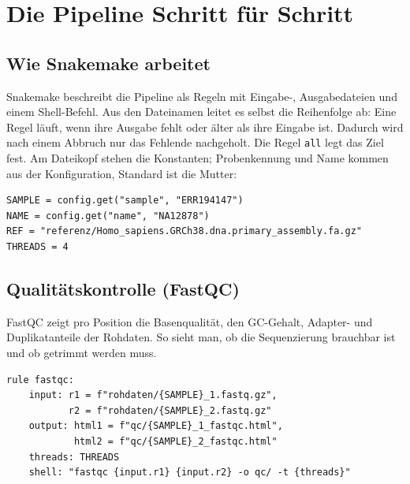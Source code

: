 \documentclass[10pt,a4paper,twocolumn]{article}
\begin{document}
\section{Die Pipeline Schritt für Schritt}
\subsection{Wie Snakemake arbeitet}
Snakemake \citep{molder2021} beschreibt die Pipeline als Regeln mit Eingabe-, Ausgabedateien und einem Shell-Befehl. Aus den Dateinamen leitet es selbst die Reihenfolge ab: Eine Regel läuft, wenn ihre Ausgabe fehlt oder älter als ihre Eingabe ist. Dadurch wird nach einem Abbruch nur das Fehlende nachgeholt. Die Regel \texttt{all} legt das Ziel fest. Am Dateikopf stehen die Konstanten; Probenkennung und Name kommen aus der Konfiguration, Standard ist die Mutter:
\begin{lstlisting}
SAMPLE = config.get("sample", "ERR194147")
NAME = config.get("name", "NA12878")
REF = "referenz/Homo_sapiens.GRCh38.dna.primary_assembly.fa.gz"
THREADS = 4
\end{lstlisting}
 
\subsection{Qualitätskontrolle (FastQC)}
FastQC zeigt pro Position die Basenqualität, den GC-Gehalt, Adapter- und Duplikatanteile der Rohdaten. So sieht man, ob die Sequenzierung brauchbar ist und ob getrimmt werden muss.
\begin{lstlisting}
rule fastqc:
    input: r1 = f"rohdaten/{SAMPLE}_1.fastq.gz",
           r2 = f"rohdaten/{SAMPLE}_2.fastq.gz"
    output: html1 = f"qc/{SAMPLE}_1_fastqc.html",
            html2 = f"qc/{SAMPLE}_2_fastqc.html"
    threads: THREADS
    shell: "fastqc {input.r1} {input.r2} -o qc/ -t {threads}"
\end{lstlisting}
 
\end{document}
